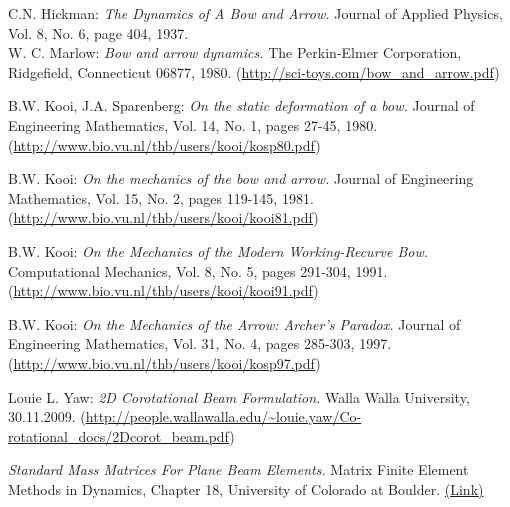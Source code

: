 %
%

\begin{thebibliography}{99}

 C.N. Hickman: \textit{The Dynamics of A Bow and Arrow.} Journal of Applied Physics, Vol. 8, No. 6, page 404, 1937.\\

 W. C. Marlow: \textit{Bow and arrow dynamics.} The Perkin-Elmer Corporation, Ridgefield, Connecticut 06877, 1980. (\url{http://sci-toys.com/bow_and_arrow.pdf})

 B.W. Kooi, J.A. Sparenberg: \textit{On the static deformation of a bow.} Journal of Engineering Mathematics, Vol. 14, No. 1, pages 27-45, 1980.\\
(\url{http://www.bio.vu.nl/thb/users/kooi/kosp80.pdf})

 B.W. Kooi: \textit{On the mechanics of the bow and arrow.} Journal of Engineering Mathematics, Vol. 15, No. 2, pages 119-145, 1981.\\
(\url{http://www.bio.vu.nl/thb/users/kooi/kooi81.pdf})

 B.W. Kooi: \textit{On the Mechanics of the Modern Working-Recurve Bow.} Computational Mechanics, Vol. 8, No. 5, pages 291-304, 1991.\\
(\url{http://www.bio.vu.nl/thb/users/kooi/kooi91.pdf})

 B.W. Kooi: \textit{On the Mechanics of the Arrow: Archer's Paradox.} Journal of Engineering Mathematics, Vol. 31, No. 4, pages 285-303, 1997.\\
(\url{http://www.bio.vu.nl/thb/users/kooi/kosp97.pdf})

 Louie L. Yaw: \textit{2D Corotational Beam Formulation.} Walla Walla University, 30.11.2009. (\url{http://people.wallawalla.edu/~louie.yaw/Co-rotational_docs/2Dcorot_beam.pdf})

 \textit{Standard Mass Matrices For Plane Beam Elements.} Matrix Finite Element Methods in Dynamics, Chapter 18, University of Colorado at Boulder. \href{http://www.colorado.edu/engineering/CAS/courses.d/MFEMD.d/MFEMD.Ch18.d/MFEMD.Ch18.pdf}{(\underline{Link})}


\end{thebibliography}
